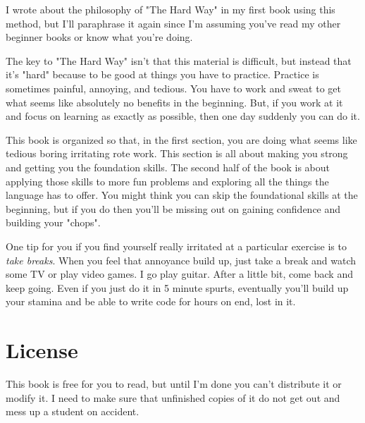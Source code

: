 I wrote about the philosophy of "The Hard Way" in my first book using
this method, but I'll paraphrase it again since I'm assuming you've
read my other beginner books or know what you're doing.

The key to "The Hard Way" isn't that this material is difficult, but
instead that it's "hard" because to be good at things you have to
practice.  Practice is sometimes painful, annoying, and tedious.  You
have to work and sweat to get what seems like absolutely no benefits
in the beginning.  But, if you work at it and focus on learning as
exactly as possible, then one day suddenly you can do it.

This book is organized so that, in the first section, you are doing
what seems like tedious boring irritating rote work.  This section
is all about making you strong and getting you the foundation skills.
The second half of the book is about applying those skills to more
fun problems and exploring all the things the language has to offer.
You might think you can skip the foundational skills at the beginning,
but if you do then you'll be missing out on gaining confidence and
building your "chops".

One tip for you if you find yourself really irritated at a particular
exercise is to \emph{take breaks}.  When you feel that annoyance build
up, just take a break and watch some TV or play video games.  I go play
guitar.  After a little bit, come back and keep going.  Even if you just
do it in 5 minute spurts, eventually you'll build up your stamina and
be able to write code for hours on end, lost in it.


\section{License}

This book is free for you to read, but until I'm done you can't distribute it
or modify it.  I need to make sure that unfinished copies of it do not get out
and mess up a student on accident.


